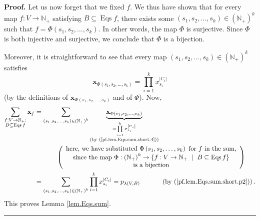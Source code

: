 \documentclass[numbers=enddot,12pt,final,onecolumn,notitlepage]{scrartcl}%
\theoremstyle{definition}
\newenvironment{proof}[1][Proof]{\noindent\textbf{#1.} }{\ \rule{0.5em}{0.5em}}
\newenvironment{vershort}{}{}
\let\sumnonlimits\sum
\let\prodnonlimits\prod
\renewcommand{\sum}{\sumnonlimits\limits}
\renewcommand{\prod}{\prodnonlimits\limits}
\begin{document}
\begin{vershort}
\begin{proof}
Let us now forget that we fixed $f$. We thus have shown that for every map
$f:V\rightarrow\mathbb{N}_{+}$ satisfying $B\subseteq\operatorname*{Eqs}f$,
there exists some $\left(  s_{1},s_{2},\ldots,s_{k}\right)  \in\left(
\mathbb{N}_{+}\right)  ^{k}$ such that $f=\Phi\left(  s_{1},s_{2},\ldots
,s_{k}\right)  $. In other words, the map $\Phi$ is surjective. Since $\Phi$
is both injective and surjective, we conclude that $\Phi$ is a bijection.

Moreover, it is straightforward to see that every map $\left(  s_{1}%
,s_{2},\ldots,s_{k}\right)  \in\left(  \mathbb{N}_{+}\right)  ^{k}$ satisfies%
\begin{equation}
\mathbf{x}_{\Phi\left(  s_{1},s_{2},\ldots,s_{k}\right)  }=\prod_{i=1}%
^{k}x_{s_{i}}^{\left\vert C_{i}\right\vert } \label{pf.lem.Eqs.sum.short.4}%
\end{equation}
(by the definitions of $\mathbf{x}_{\Phi\left(  s_{1},s_{2},\ldots
,s_{k}\right)  }$ and of $\Phi$). Now,%
\begin{align*}
\sum_{\substack{f:V\rightarrow\mathbb{N}_{+};\\B\subseteq\operatorname*{Eqs}%
f}}\mathbf{x}_{f}  &  =\sum_{\left(  s_{1},s_{2},\ldots,s_{k}\right)
\in\left(  \mathbb{N}_{+}\right)  ^{k}}\underbrace{\mathbf{x}_{\Phi\left(
s_{1},s_{2},\ldots,s_{k}\right)  }}_{\substack{=\prod_{i=1}^{k}x_{s_{i}%
}^{\left\vert C_{i}\right\vert }\\\text{(by (\ref{pf.lem.Eqs.sum.short.4}))}%
}}\\
&  \ \ \ \ \ \ \ \ \ \ \left(
\begin{array}
[c]{c}%
\text{here, we have substituted }\Phi\left(  s_{1},s_{2},\ldots,s_{k}\right)
\text{ for }f\text{ in the sum,}\\
\text{since the map }\Phi:\left(  \mathbb{N}_{+}\right)  ^{k}\rightarrow
\left\{  f:V\rightarrow\mathbb{N}_{+}\ \mid\ B\subseteq\operatorname*{Eqs}%
f\right\} \\
\text{is a bijection}%
\end{array}
\right) \\
&  =\sum_{\left(  s_{1},s_{2},\ldots,s_{k}\right)  \in\left(  \mathbb{N}%
_{+}\right)  ^{k}}\prod_{i=1}^{k}x_{s_{i}}^{\left\vert C_{i}\right\vert
}=p_{\lambda\left(  V,B\right)  }\ \ \ \ \ \ \ \ \ \ \left(  \text{by
(\ref{pf.lem.Eqs.sum.short.p2})}\right)  .
\end{align*}
This proves Lemma \ref{lem.Eqs.sum}.
\end{proof}
\end{vershort}
\end{document}
